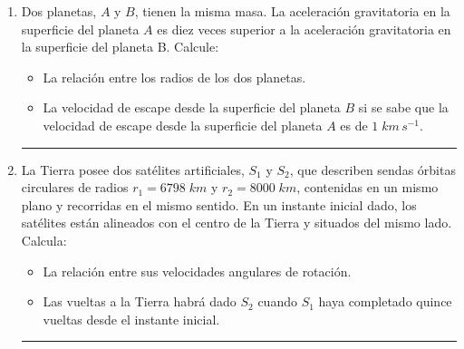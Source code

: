 \documentclass[a4paper,12pt]{exam}
\newcommand{\halmos}{\vspace*{-7mm}
	
					\begin{flushright}
						\rule{1mm}{2.5mm} 
					\end{flushright}\vspace*{-6mm}
						
					  }
\renewcommand{\qed}{\halmos}
\begin{document}
\newpage
{}

\vspace*{.1cm}


\begin{enumerate}
	
	\item Dos planetas, $A$ y $B$, tienen la misma masa. La aceleración gravitatoria en la 
		superficie del planeta $A$ es diez veces superior a la aceleración gravitatoria en 					la 					superficie del  planeta B. Calcule: 
			\begin{itemize}
				\item[a)]  La relación entre los radios de los dos planetas.
				\item[b)] La velocidad de escape desde la superficie del planeta $B$ si se 												sabe que la velocidad de escape desde la superficie del planeta $A$ es de $1\;km\,s^{-1}$.
			\end{itemize}
		\qed



	\item La  Tierra posee dos satélites artificiales, $S_1$ y $S_2$, que describen sendas órbitas circulares de radios $r_1=6798 \;km$ y $r_2=8000\;km$, contenidas en un mismo plano y recorridas en el mismo sentido. En un instante inicial dado, los satélites están alineados con el centro de la Tierra y situados del mismo lado. Calcula:
 		\begin{itemize}
 			\item[a)] La relación entre sus velocidades angulares de rotación.
 			\item[b)] Las vueltas a la Tierra habrá dado $S_2$ cuando $S_1$ haya completado quince vueltas desde el instante inicial.
 		\end{itemize}
 		\qed
 		
 			
%	    
 			

\end{enumerate}
\end{document}

